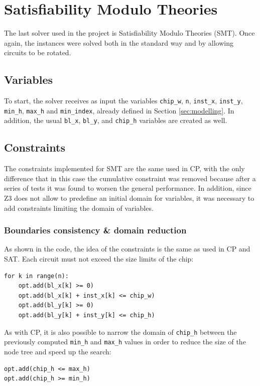 \documentclass[a4paper, 12pt]{article}
\begin{document}
\clearpage

\section{Satisfiability Modulo Theories}

The last solver used in the project is Satisfiability Modulo Theories (SMT). Once again, the instances were solved both in the standard way and by allowing circuits to be rotated.

\subsection{Variables}
To start, the solver receives as input the variables \verb|chip_w|, \verb|n|, \verb|inst_x|, \verb|inst_y|, \verb|min_h|, \verb|max_h| and \verb|min_index|, already defined in Section \ref{sec:modelling}. In addition, the usual \verb|bl_x|, \verb|bl_y|, and \verb|chip_h| variables are created as well. 

\subsection{Constraints}
The constraints implemented for SMT are the same used in CP, with the only difference that in this case the cumulative constraint was removed because after a series of tests it was found to worsen the general performance. In addition, since Z3 does not allow to predefine an initial domain for variables, it was necessary to add constraints limiting the domain of variables.
\subsubsection{Boundaries consistency \& domain reduction}
As shown in the code, the idea of the constraints is the same as used in CP and SAT. Each circuit must not exceed the size limits of the chip:
\begin{verbatim}
for k in range(n):
    opt.add(bl_x[k] >= 0)
    opt.add(bl_x[k] + inst_x[k] <= chip_w)
    opt.add(bl_y[k] >= 0)
    opt.add(bl_y[k] + inst_y[k] <= chip_h)
\end{verbatim}

As with CP, it is also possible to narrow the domain of \verb|chip_h| between the previously computed \verb|min_h| and \verb|max_h| values in order to reduce the size of the node tree and speed up the search:
\begin{verbatim}
opt.add(chip_h <= max_h)
opt.add(chip_h >= min_h)
\end{verbatim}
\end{document}
